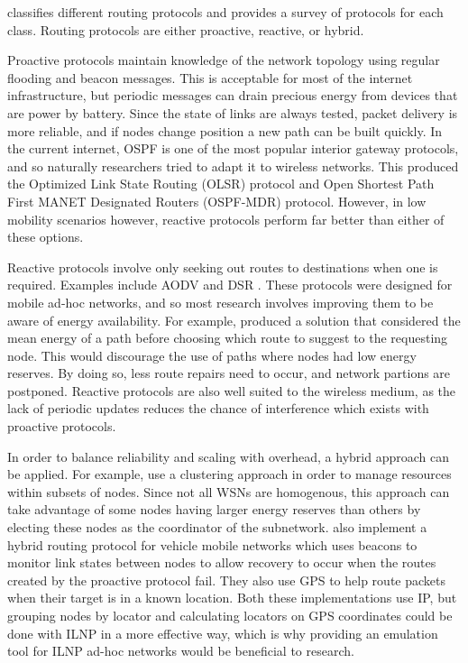 \documentclass[12pt]{article}
\begin{document}
\cite{hassan} classifies different routing protocols and provides a survey of protocols for each class. Routing protocols are either proactive, reactive, or hybrid. 

Proactive protocols maintain knowledge of the network topology using regular flooding and beacon messages. This is acceptable for most of the internet infrastructure, but periodic messages can drain precious energy from devices that are power by battery. Since the state of links are always tested, packet delivery is more reliable, and if nodes change position a new path can be built quickly. In the current internet, OSPF is one of the most popular interior gateway protocols, and so naturally researchers tried to adapt it to wireless networks. This produced the Optimized Link State Routing (OLSR) protocol \cite{olsr} and Open Shortest Path First MANET Designated Routers (OSPF-MDR) protocol. However, in low mobility scenarios however, reactive protocols perform far better than either of these options. 

Reactive protocols involve only seeking out routes to destinations when one is required. Examples include AODV \cite{aodv} and DSR \cite{dsr}. These protocols were designed for mobile ad-hoc networks, and so most research involves improving them to be aware of energy availability. For example, \cite{eaodv} produced a solution that considered the mean energy of a path before choosing which route to suggest to the requesting node. This would discourage the use of paths where nodes had low energy reserves. By doing so, less route repairs need to occur, and network partions are postponed. Reactive protocols are also well suited to the wireless medium, as the lack of periodic updates reduces the chance of interference which exists with proactive protocols.

In order to balance reliability and scaling with overhead, a hybrid approach can be applied. For example, \cite{cluster} use a clustering approach in order to manage resources within subsets of nodes. Since not all WSNs are homogenous, this approach can take advantage of some nodes having larger energy reserves than others by electing these nodes as the coordinator of the subnetwork. \cite{vanet} also implement a hybrid routing protocol for vehicle mobile networks which uses beacons to monitor link states between nodes to allow recovery to occur when the routes created by the proactive protocol fail. They also use GPS to help route packets when their target is in a known location. Both these implementations use IP, but grouping nodes by locator and calculating locators on GPS coordinates could be done with ILNP in a more effective way, which is why providing an emulation tool for ILNP ad-hoc networks would be beneficial to research.
\end{document}
